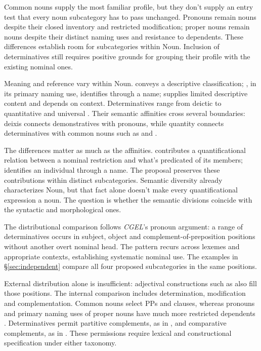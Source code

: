 \documentclass[12pt]{article}
\begin{document}
Common nouns supply the most familiar profile, but they don't supply an entry test that every noun subcategory has to pass unchanged. Pronouns remain nouns despite their closed inventory and restricted modification; proper nouns remain nouns despite their distinct naming uses and resistance to dependents. These differences establish room for subcategories within Noun. Inclusion of determinatives still requires positive grounds for grouping their profile with the existing nominal ones.

Meaning and reference vary within Noun.  conveys a descriptive classification; , in its primary naming use, identifies through a name;  supplies limited descriptive content and depends on context. Determinatives range from deictic  to quantitative  and universal  \citep[358--360, 370--405, 425--428, 515--521]{huddleston2002}. Their semantic affinities cross several boundaries: deixis connects demonstratives with pronouns, while quantity connects determinatives with common nouns such as  and .

The differences matter as much as the affinities.  contributes a quantificational relation between a nominal restriction and what's predicated of its members;  identifies an individual through a name. The proposal preserves these contributions within distinct subcategories. Semantic diversity already characterizes Noun, but that fact alone doesn't make every quantificational expression a noun. The question is whether the semantic divisions coincide with the syntactic and morphological ones.

The distributional comparison follows \textit{CGEL}'s pronoun argument: a range of determinatives occurs in subject, object and complement-of-preposition positions without another overt nominal head. The pattern recurs across lexemes and appropriate contexts, establishing systematic nominal use. The examples in §\ref{sec:independent} compare all four proposed subcategories in the same positions.

External distribution alone is insufficient: adjectival constructions such as  also fill those positions. The internal comparison includes determination, modification and complementation. Common nouns select PPs and clauses, whereas pronouns and primary naming uses of proper nouns have much more restricted dependents \citep[429--430, 439--443, 517--521]{huddleston2002}. Determinatives permit partitive complements, as in , and comparative complements, as in  \citep[392--394, 411--412, 432--433]{huddleston2002}. These permissions require lexical and constructional specification under either taxonomy.
\end{document}
